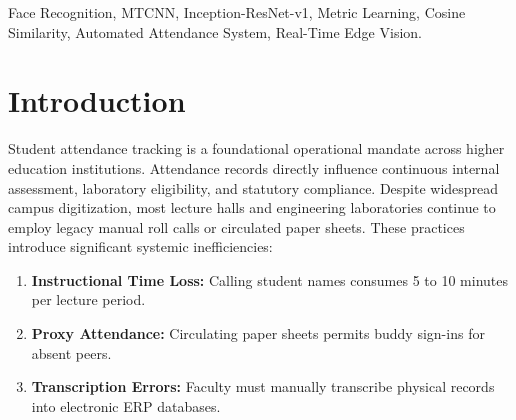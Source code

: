 \documentclass[conference]{IEEEtran}
\begin{document}
\begin{abstract}
Student attendance tracking in academic institutions frequently suffers from proxy marking, instruction time loss, and administrative clerical overheads when executed via conventional paper sign-in sheets. While biometric fingerprint scanners address proxy marking, they introduce physical queues and raise acute hygiene concerns in shared laboratory environments. This study designs and evaluates an edge-ready, contactless smart attendance prototype leveraging deep facial metric learning. The proposed architecture integrates Multi-Task Cascaded Convolutional Networks (MTCNN) for 5-point facial landmark alignment with an Inception-ResNet-v1 feature extractor pretrained on VGGFace2 to compute 512-dimensional $L_2$-normalized embeddings. Face verification is formulated as an open-set task evaluated using Cosine Similarity against an enrolled consent-based gallery. An optimal decision threshold ($\tau = 0.75$) rejects unregistered individuals as `Unknown' while confidently verifying enrolled students. To overcome CPU latency bottlenecks on commodity hardware, spatial downsampling ($0.5\times$) and temporal frame-skipping optimizations are introduced, achieving stable 30~FPS throughput on CPU. Empirical evaluation on the standard Labeled Faces in the Wild (LFW) benchmark yields 95.2\% verification accuracy and an Area Under Curve (AUC) of 0.984, establishing a robust, hygienic, and privacy-respecting attendance solution.
\end{abstract}

\begin{IEEEkeywords}
Face Recognition, MTCNN, Inception-ResNet-v1, Metric Learning, Cosine Similarity, Automated Attendance System, Real-Time Edge Vision.
\end{IEEEkeywords}

\section{Introduction}
Student attendance tracking is a foundational operational mandate across higher education institutions. Attendance records directly influence continuous internal assessment, laboratory eligibility, and statutory compliance. Despite widespread campus digitization, most lecture halls and engineering laboratories continue to employ legacy manual roll calls or circulated paper sheets. These practices introduce significant systemic inefficiencies:
\begin{enumerate}
    \item \textbf{Instructional Time Loss:} Calling student names consumes 5 to 10 minutes per lecture period.
    \item \textbf{Proxy Attendance:} Circulating paper sheets permits buddy sign-ins for absent peers.
    \item \textbf{Transcription Errors:} Faculty must manually transcribe physical records into electronic ERP databases.
\end{enumerate}
\end{document}
